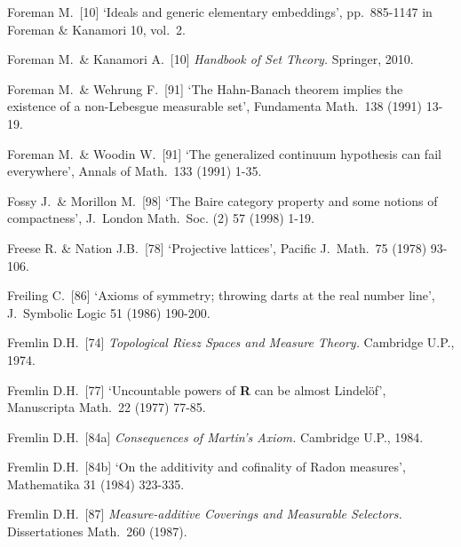 {%

Foreman M.\ [10] `Ideals and generic elementary embeddings',  pp.\ 885-1147
in {\smc Foreman \& Kanamori 10}, vol.\ 2.
\cmmnt{[547Z.]}

Foreman M.\ \& Kanamori A.\  [10] {\it Handbook of Set Theory.}
Springer, 2010.

Foreman M.\ \& Wehrung F.\ [91] `The Hahn-Banach theorem implies the
existence of a non-Lebesgue measurable set', Fundamenta Math.\ 138
(1991) 13-19.
\cmmnt{[563A.]}

Foreman M.\ \& Woodin W.\ [91] `The generalized continuum hypothesis can
fail everywhere', Annals of Math.\ 133 (1991) 1-35.
\cmmnt{[525Z.]}

Fossy J.\ \& Morillon M.\ [98] `The Baire category property and some
notions of compactness', J.\ London Math.\ Soc. (2) 57 (1998) 1-19.
\cmmnt{[\S566 {\it notes\/}.]}



Freese R. \& Nation J.B.\ [78] `Projective lattices',
Pacific J.\ Math.\ 75 (1978) 93-106.
\cmmnt{[\S518 {\it notes\/}.]}

Freiling C.\ [86] `Axioms of symmetry;  throwing darts at the real number
line', J.\ Symbolic Logic 51 (1986) 190-200.
\cmmnt{[537K.]}

Fremlin D.H.\ [74] {\it Topological Riesz Spaces and Measure Theory.}
Cambridge U.P., 1974.
\cmmnt{[564Xc.]}

Fremlin D.H.\ [77]
`Uncountable powers of {\bf R} can be almost Lindel\"of',
Manuscripta Math.\ 22 (1977) 77-85.
\cmmnt{[533J.]}

Fremlin D.H.\ [84a] {\it Consequences of Martin's Axiom.}
Cambridge U.P., 1984.

Fremlin D.H.\ [84b] `On the additivity and cofinality of Radon measures',
Mathematika 31 (1984) 323-335.
\cmmnt{[\S524 {\it notes\/}.]}

Fremlin D.H.\ [87] {\it Measure-additive Coverings and
Measurable Selectors.} Dissertationes Math.\ 260 (1987).
\cmmnt{[551A.]}

}
